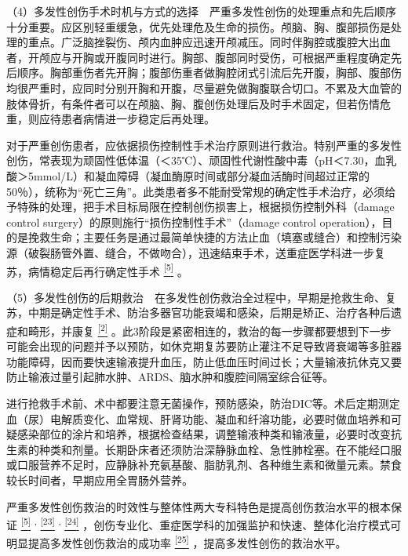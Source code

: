 （4）多发性创伤手术时机与方式的选择　严重多发性创伤的处理重点和先后顺序十分重要。应区别轻重缓急，优先处理危及生命的损伤。颅脑、胸、腹部损伤是处理的重点。广泛脑挫裂伤、颅内血肿应迅速开颅减压。同时伴胸腔或腹腔大出血者，开颅应与开胸或开腹同时进行。胸部、腹部同时受伤，可根据严重程度确定先后顺序。胸部重伤者先开胸；腹部伤重者做胸腔闭式引流后先开腹，胸部、腹部伤均很严重时，应同时分别开胸和开腹，尽量避免做胸腹联合切口。不累及大血管的肢体骨折，有条件者可以在颅脑、胸、腹创伤处理后及时手术固定，但若伤情危重，则应待患者病情进一步稳定后再处理。

对于严重创伤患者，应依据损伤控制性手术治疗原则进行救治。特别严重的多发性创伤，常表现为顽固性低体温（＜35℃）、顽固性代谢性酸中毒（pH＜7.30，血乳酸＞5mmol/L）和凝血障碍（凝血酶原时间或部分凝血活酶时间超过正常的50％），统称为“死亡三角”。此类患者多不能耐受常规的确定性手术治疗，必须给予特殊的处理，把手术目标局限在控制创伤损害上，根据损伤控制外科（damage
control surgery）的原则施行“损伤控制性手术”（damage control
operation），目的是挽救生命；主要任务是通过最简单快捷的方法止血（填塞或缝合）和控制污染源（破裂肠管外置、缝合，不做吻合），迅速结束手术，送重症医学科进一步复苏，病情稳定后再行确定性手术
\protect\hyperlink{text00024.htmlux5cux23ch5-23}{\textsuperscript{{[}5{]}}}
。

（5）多发性创伤的后期救治　在多发性创伤救治全过程中，早期是抢救生命、复苏，中期是确定性手术、防治多器官功能衰竭和感染，后期是矫正、治疗各种后遗症和畸形，并康复
\protect\hyperlink{text00024.htmlux5cux23ch2-23}{\textsuperscript{{[}2{]}}}
。此3阶段是紧密相连的，救治的每一步骤都要想到下一步可能会出现的问题并予以预防，如休克期复苏要防止灌注不足导致肾衰竭等多脏器功能障碍，因而要快速输液提升血压，防止低血压时间过长；大量输液抗休克又要防止输液过量引起肺水肿、ARDS、脑水肿和腹腔间隔室综合征等。

进行抢救手术前、术中都要注意无菌操作，预防感染，防治DIC等。术后定期测定血（尿）电解质变化、血常规、肝肾功能、凝血和纤溶功能，必要时做血培养和可疑感染部位的涂片和培养，根据检查结果，调整输液种类和输液量，必要时改变抗生素的种类和剂量。长期卧床者还须防治深静脉血栓、急性肺栓塞。在不能经口服或口服营养不足时，应静脉补充氨基酸、脂肪乳剂、各种维生素和微量元素。禁食较长时间者，早期应用全胃肠外营养。

严重多发性创伤救治的时效性与整体性两大专科特色是提高创伤救治水平的根本保证
\protect\hyperlink{text00024.htmlux5cux23ch5-23}{\textsuperscript{{[}5{]}}}
\textsuperscript{,}
\protect\hyperlink{text00024.htmlux5cux23ch23-23}{\textsuperscript{{[}23{]}}}
\textsuperscript{,}
\protect\hyperlink{text00024.htmlux5cux23ch24-23}{\textsuperscript{{[}24{]}}}
，创伤专业化、重症医学科的加强监护和快速、整体化治疗模式可明显提高多发性创伤救治的成功率
\protect\hyperlink{text00024.htmlux5cux23ch25-23}{\textsuperscript{{[}25{]}}}
，提高多发性创伤的救治水平。

